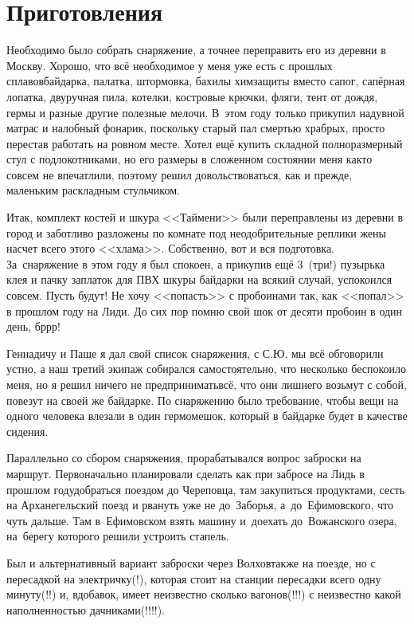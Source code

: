 \chapter{Приготовления} 

Необходимо было собрать снаряжение, а точнее переправить его из деревни в Москву. Хорошо, что всё необходимое у меня уже есть с прошлых сплавов\mdash  байдарка, палатка, штормовка, бахилы химзащиты вместо сапог, сапёрная лопатка, двуручная пила, котелки, костровые крючки, фляги, тент от дождя, гермы и разные другие полезные мелочи. В~этом году только прикупил надувной матрас и налобный фонарик, поскольку старый пал смертью храбрых, просто перестав работать на ровном месте. Хотел ещё купить складной полноразмерный стул с подлокотниками, но его размеры в сложенном состоянии меня как\sdash то совсем не впечатлили, поэтому решил довольствоваться, как и прежде, маленьким раскладным стульчиком.

Итак, комплект костей и шкура <<Таймени>> были переправлены из деревни в город и заботливо разложены по комнате под неодобрительные реплики жены насчет всего этого <<хлама>>. Собственно, вот и вся подготовка. За~снаряжение в этом году я был спокоен, а прикупив ещё 3~(три!) пузырька клея и пачку заплаток для ПВХ шкуры байдарки на всякий случай, успокоился совсем. Пусть будут! Не хочу <<попасть>> с пробоинами так, как <<попал>> в прошлом году на Лиди. До сих пор помню свой шок от десяти пробоин в один день, бр\sdash р\sdash р!

Геннадичу и Паше я дал свой список снаряжения, с С.Ю. мы всё обговорили устно, а наш третий экипаж собирался самостоятельно, что несколько беспокоило меня, но я решил ничего не предпринимать\mdash всё, что они лишнего возьмут с собой, повезут на своей же байдарке. По снаряжению было требование, чтобы вещи на одного человека влезали в один гермомешок, который в байдарке будет в качестве сидения.

Параллельно со сбором снаряжения, прорабатывался вопрос заброски на маршрут. Первоначально планировали сделать как при забросе на Лидь в прошлом году\mdash добраться поездом до Череповца, там закупиться продуктами, сесть на Арханегельский поезд и рвануть уже не до~Заборья, а~до~Ефимовского, что чуть дальше. Там в~Ефимовском взять машину и~доехать до~Вожанского озера, на~берегу которого решили устроить стапель. 

Был и альтернативный вариант заброски через Волхов\mdash также на поезде, но с пересадкой на электричку(!), которая стоит на станции пересадки всего одну минуту(!!) и, вдобавок, имеет неизвестно сколько вагонов(!!!) с неизвестно какой наполненностью дачниками(!!!!). 

